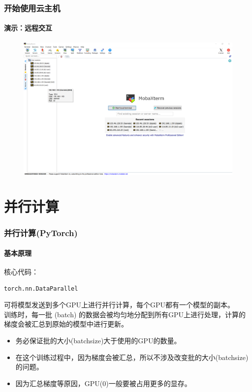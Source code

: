 \documentclass[10pt]{beamer}
\begin{document}
        \begin{frame}
            \frametitle{开始使用云主机}
                \framesubtitle{演示：远程交互}

                \centering
                \begin{figure}
                    \hyperlink{https://mobaxterm.mobatek.net}{
                        \includegraphics[width=\textwidth]{src/img/MobaXterm.png}
                        }
                \end{figure}

        \end{frame}

    \section{并行计算}
        \begin{frame}[fragile]
            \frametitle{并行计算(PyTorch)}
                \framesubtitle{基本原理}
                    核心代码： \\
                    \begin{lstlisting}
torch.nn.DataParallel                    
                    \end{lstlisting}
                    可将模型发送到多个GPU上进行并行计算，每个GPU都有一个模型的副本。\\
                    训练时，每一批 (batch) 的数据会被均匀地分配到所有GPU上进行处理，计算的梯度会被汇总到原始的模型中进行更新。\\
                    \hspace*{\fill}
                    \begin{itemize}
                        \item 务必保证批的大小(batchsize)大于使用的GPU的数量。
                        \item 在这个训练过程中，因为梯度会被汇总，所以不涉及改变批的大小(batchsize)的问题。
                        \item 因为汇总梯度等原因，GPU(0)一般要被占用更多的显存。
                    \end{itemize}

        \end{frame}
\end{document}

